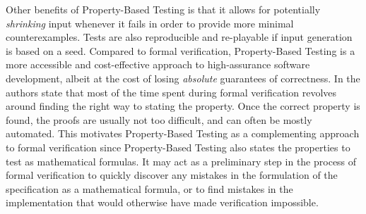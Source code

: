 \documentclass[twoside,11pt,openright]{report}
\newcommand{\pbt}{Property-Based Testing}
\begin{document}
Other benefits of \pbt{} is that it allows for potentially \textit{shrinking} input whenever it fails in order to provide more minimal counterexamples. Tests are also reproducible and re-playable if input generation is based on a seed. Compared to formal verification, \pbt{} is a more accessible and cost-effective approach to high-assurance software development, albeit at the cost of losing \textit{absolute} guarantees of correctness. In \cite{denes2014quickchick} the authors state that most of the time spent during formal verification revolves around finding the right way to stating the property. Once the correct property is found, the proofs are usually not too difficult, and can often be mostly automated. This motivates \pbt{} as a complementing approach to formal verification since \pbt{} also states the properties to test as mathematical formulas. It may act as a preliminary step in the process of formal verification to quickly discover any mistakes in the formulation of the specification as a mathematical formula, or to find mistakes in the implementation that would otherwise have made verification impossible.
\end{document}
